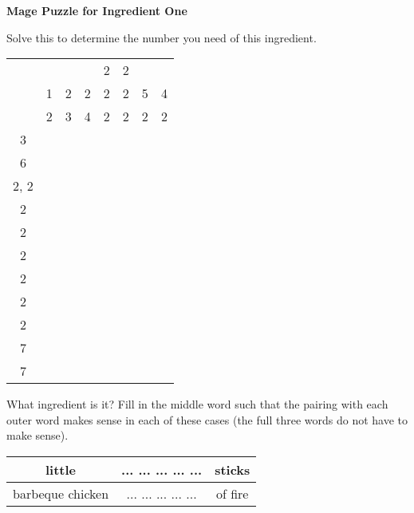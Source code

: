 \documentclass[white]{guildcamp3}
\begin{document}
\name{\wMagePuzzleOne{}} %

\large\textbf{Mage Puzzle for Ingredient One}  

Solve this to determine the number you need of this ingredient. 


\begin{tabular}{|c|c|c|c|c|c|c|c|}
	\hline \rule[-2ex]{0pt}{5.5ex}  &  &  &  & 2 & 2 &  &  \\ 
	  & 1 & 2 & 2 & 2 & 2 & 5 & 4 \\ 
      & 2 & 3 & 4 & 2 & 2 & 2 & 2 \\ 
	\hline \rule[-2ex]{0pt}{5.5ex} 3 &  &  &  &  &  &  &  \\ 
	\hline \rule[-2ex]{0pt}{5.5ex} 6 &  &  &  &  &  &  &  \\ 
	\hline \rule[-2ex]{0pt}{5.5ex} 2, 2 &  &  &  &  &  &  &  \\ 
	\hline \rule[-2ex]{0pt}{5.5ex} 2 &  &  &  &  &  &  &  \\ 
	\hline \rule[-2ex]{0pt}{5.5ex} 2 &  &  &  &  &  &  &  \\ 
	\hline \rule[-2ex]{0pt}{5.5ex} 2 &  &  &  &  &  &  &  \\ 
	\hline \rule[-2ex]{0pt}{5.5ex} 2 &  &  &  &  &  &  &  \\ 
	\hline \rule[-2ex]{0pt}{5.5ex} 2 &  &  &  &  &  &  &  \\ 
	\hline \rule[-2ex]{0pt}{5.5ex} 2 &  &  &  &  &  &  &  \\ 
	\hline \rule[-2ex]{0pt}{5.5ex} 7 &  &  &  &  &  &  &  \\ 
	\hline \rule[-2ex]{0pt}{5.5ex} 7 &  &  &  &  &  &  &  \\ 
	\hline 
\end{tabular} 

What ingredient is it? Fill in the middle word such that the pairing with each outer word makes sense in each of these cases (the full three words do not have to make sense).

\begin{tabular}{|c|c|c|}
	\hline \rule[-2ex]{0pt}{5.5ex} little & ... ... ... ... ... & sticks \\ 
	\hline \rule[-2ex]{0pt}{5.5ex} barbeque chicken & ... ... ... ... ... & of fire \\ 
	\hline 
\end{tabular} 

\end{document}
